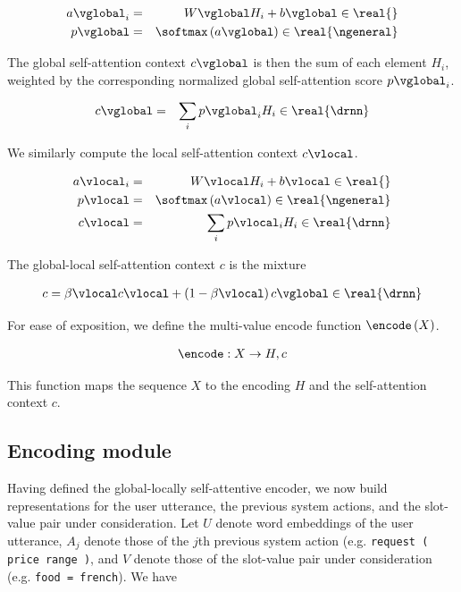 \documentclass[11pt,a4paper]{article}
\begin{document}
\begin{eqnarray}
\label{eq:selfattnscore}
a\vglobal_i &=& W\vglobal H_i + b\vglobal \in \real{} \\
p\vglobal &=& \softmax \left( a\vglobal \right) \in \real{\ngeneral}
\end{eqnarray}

The global self-attention context $c\vglobal$ is then the sum of each element $H_i$, weighted by the corresponding normalized global self-attention score $p\vglobal_i$.

\begin{eqnarray}
\label{eq:selfattncontext}
c\vglobal &=& \sum_i p\vglobal_i H_i \in \real{\drnn}
\end{eqnarray}

We similarly compute the local self-attention context $c\vlocal$.

\begin{eqnarray}
a\vlocal_i &=& W\vlocal H_i + b\vlocal \in \real{} \\
p\vlocal &=& \softmax \left( a\vlocal \right) \in \real{\ngeneral} \\
c\vlocal &=& \sum_i p\vlocal_i H_i \in \real{\drnn}
\end{eqnarray}

The global-local self-attention context $c$ is the mixture

\begin{eqnarray}
c = \beta\vlocal c\vlocal + \left( 1 - \beta\vlocal \right) c\vglobal \in \real{\drnn}
\end{eqnarray}

For ease of exposition, we define the multi-value encode function $\encode \left( X \right)$.

\begin{eqnarray}
\encode : X \rightarrow H, c
\end{eqnarray}

This function maps the sequence $X$ to the encoding $H$ and the self-attention context $c$.




\subsection{Encoding module}

Having defined the global-locally self-attentive encoder, we now build representations for the user utterance, the previous system actions, and the slot-value pair under consideration.
Let $U$ denote word embeddings of the user utterance, $A_j$ denote those of the $j$th previous system action (e.g. \texttt{request ( price range )}, and $V$ denote those of the slot-value pair under consideration (e.g. \texttt{food = french}).
We have
\end{document}
